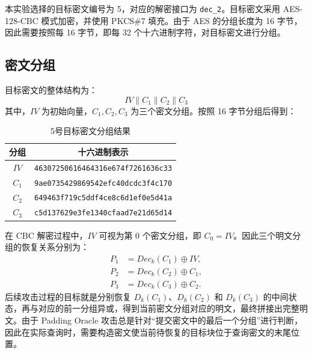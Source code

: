 本实验选择的目标密文编号为 5，对应的解密接口为 \verb|dec_2|。目标密文采用 AES-128-CBC 模式加密，并使用 PKCS\#7 填充。由于 AES 的分组长度为 16 字节，因此需要按照每 16 字节，即每 32 个十六进制字符，对目标密文进行分组。

\subsection{密文分组}

目标密文的整体结构为：
\[IV \parallel C_1 \parallel C_2 \parallel C_3\]
其中，$IV$ 为初始向量，$C_1,C_2,C_3$ 为三个密文分组。按照 16 字节分组后得到：

\begin{table}[H]
    \centering
    \caption{5号目标密文分组结果}
    \begin{tabular}{|c|c|}
        \hline
        分组 & 十六进制表示 \\
        \hline
        $IV$ & \texttt{46307250616464316e674f7261636c33} \\
        \hline
        $C_1$ & \texttt{9ae0735429869542efc40dcdc3f4c170} \\
        \hline
        $C_2$ & \texttt{649463f719c5ddf4ce8c6d1ef0e5d41a} \\
        \hline
        $C_3$ & \texttt{c5d137629e3fe1340cfaad7e21d65d14} \\
        \hline
    \end{tabular}
\end{table}
在 CBC 解密过程中，$IV$ 可视为第 0 个密文分组，即 $C_0 = IV$。因此三个明文分组的恢复关系分别为：
\begin{align*}
    P_1 &= Dec_k(C_1) \oplus IV, \\
    P_2 &= Dec_k(C_2) \oplus C_1, \\
    P_3 &= Dec_k(C_3) \oplus C_2.
\end{align*}
后续攻击过程的目标就是分别恢复 $D_k(C_1)$、$D_k(C_2)$ 和 $D_k(C_3)$ 的中间状态，再与对应的前一分组异或，得到当前密文分组对应的明文，最终拼接出完整明文。由于 Padding Oracle 攻击总是针对“提交密文中的最后一个分组”进行判断，因此在实际查询时，需要构造密文使当前待恢复的目标块位于查询密文的末尾位置。
